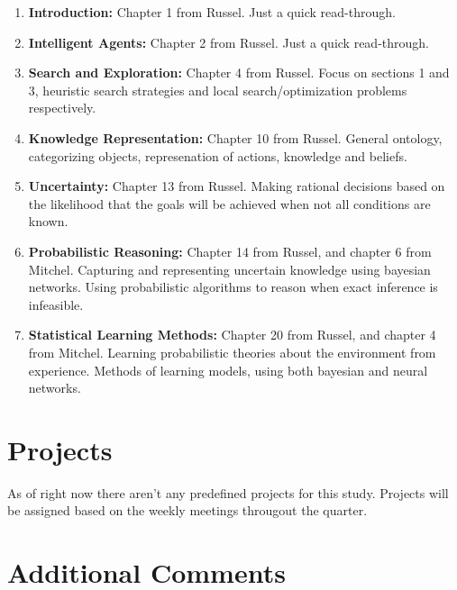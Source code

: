 \documentclass[a4paper,12pt]{article}
\begin{document}
\begin{enumerate}[1)]

  \item {\bf Introduction:} Chapter 1 from Russel. Just a quick read-through.

  \item {\bf Intelligent Agents:} Chapter 2 from Russel. Just a quick read-through.
    
  \item {\bf Search and Exploration:} Chapter 4 from Russel. Focus on
    sections 1 and 3, heuristic search strategies and local
    search/optimization problems respectively.

  \item {\bf Knowledge Representation:} Chapter 10 from
    Russel. General ontology, categorizing objects, represenation of
    actions, knowledge and beliefs.

  \item {\bf Uncertainty:} Chapter 13 from Russel. Making rational
    decisions based on the likelihood that the goals will be achieved
    when not all conditions are known.

  \item {\bf Probabilistic Reasoning:} Chapter 14 from Russel, and
    chapter 6 from Mitchel. Capturing and representing uncertain
    knowledge using bayesian networks. Using probabilistic algorithms
    to reason when exact inference is infeasible.

  \item {\bf Statistical Learning Methods:} Chapter 20 from Russel,
    and chapter 4 from Mitchel. Learning probabilistic theories about
    the environment from experience. Methods of learning models, using
    both bayesian and neural networks.

\end{enumerate}

\section*{Projects}
As of right now there aren't any predefined projects for this
study. Projects will be assigned based on the weekly meetings
througout the quarter.

\section*{Additional Comments}
\end{document}
